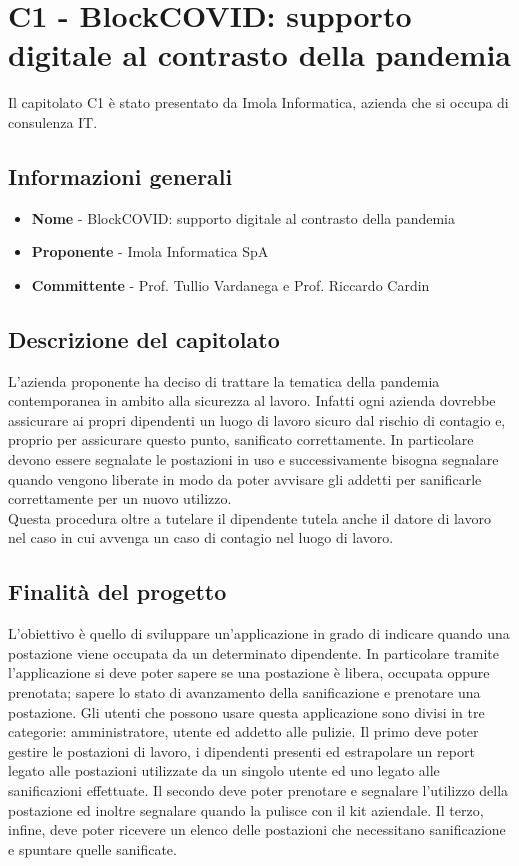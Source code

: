 \chapter{C1 - BlockCOVID: supporto digitale al contrasto della pandemia}
Il capitolato C1 è stato presentato da Imola Informatica, azienda che si occupa di consulenza IT.
\section{Informazioni generali}
\begin{itemize}
	\item \textbf{Nome} - BlockCOVID: supporto digitale al contrasto della pandemia
	\item \textbf{Proponente} - Imola Informatica SpA
	\item \textbf{Committente} - Prof. Tullio Vardanega e Prof. Riccardo Cardin
\end{itemize}
\section{Descrizione del capitolato}
L'azienda proponente ha deciso di trattare la tematica della pandemia contemporanea in ambito alla sicurezza al lavoro. Infatti ogni azienda dovrebbe assicurare ai propri dipendenti un luogo di lavoro sicuro dal rischio di contagio e, proprio per assicurare questo punto, sanificato correttamente. In particolare devono essere segnalate le postazioni in uso e successivamente bisogna segnalare quando vengono liberate in modo da poter avvisare gli addetti per sanificarle correttamente per un nuovo utilizzo.\\
Questa procedura oltre a tutelare il dipendente tutela anche il datore di lavoro nel caso in cui avvenga un caso di contagio nel luogo di lavoro.
\section{Finalità del progetto}
L'obiettivo è quello di sviluppare un'applicazione in grado di indicare quando una postazione viene occupata da un determinato dipendente. In particolare tramite l'applicazione si deve poter sapere se una postazione è libera, occupata oppure prenotata; sapere lo stato di avanzamento della sanificazione e prenotare una postazione. Gli utenti che possono usare questa applicazione sono divisi in tre categorie: amministratore, utente ed addetto alle pulizie. Il primo deve poter gestire le postazioni di lavoro, i dipendenti presenti ed estrapolare un report legato alle postazioni utilizzate da un singolo utente ed uno legato alle sanificazioni effettuate. Il secondo deve poter prenotare e segnalare l'utilizzo della postazione ed inoltre segnalare quando la pulisce con il kit aziendale. Il terzo, infine, deve poter ricevere un elenco delle postazioni che necessitano sanificazione e spuntare quelle sanificate.
